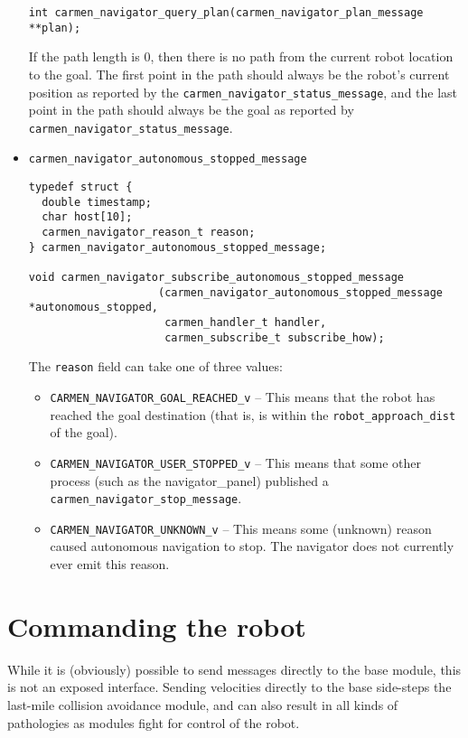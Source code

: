 \documentclass{article}
\begin{document}
\begin{itemize}
\begin{verbatim}
int carmen_navigator_query_plan(carmen_navigator_plan_message **plan);

\end{verbatim}

If the path length is 0, then there is no path from the current robot location
to the goal. The first point in the path should always be the robot's current
position as reported by the \verb!carmen_navigator_status_message!, and the
last point in the path should always be the goal as reported by
\verb!carmen_navigator_status_message!. 

\item \verb!carmen_navigator_autonomous_stopped_message!

\begin{verbatim}
typedef struct {
  double timestamp;
  char host[10];
  carmen_navigator_reason_t reason;
} carmen_navigator_autonomous_stopped_message;

void carmen_navigator_subscribe_autonomous_stopped_message
                    (carmen_navigator_autonomous_stopped_message *autonomous_stopped,
                     carmen_handler_t handler,
                     carmen_subscribe_t subscribe_how);
\end{verbatim}

The \verb!reason! field can take one of three values:
\begin{itemize}
\item \verb!CARMEN_NAVIGATOR_GOAL_REACHED_v! -- This means that the robot has
reached the goal destination (that is, is within the
\verb!robot_approach_dist! of the goal).
\item \verb!CARMEN_NAVIGATOR_USER_STOPPED_v! -- This means that some other
process (such as the navigator\_panel) published a
\verb!carmen_navigator_stop_message!. 
\item \verb!CARMEN_NAVIGATOR_UNKNOWN_v! -- This means some (unknown) reason
caused autonomous navigation to stop. The navigator does not currently ever
emit this reason.
\end{itemize}

\end{itemize}

\section{Commanding the robot}

While it is (obviously) possible to send messages directly to the base module,
this is not an exposed interface. Sending velocities directly to the base
side-steps the last-mile collision avoidance module, and can also result in
all kinds of pathologies as modules fight for control of the robot.
\end{document}
